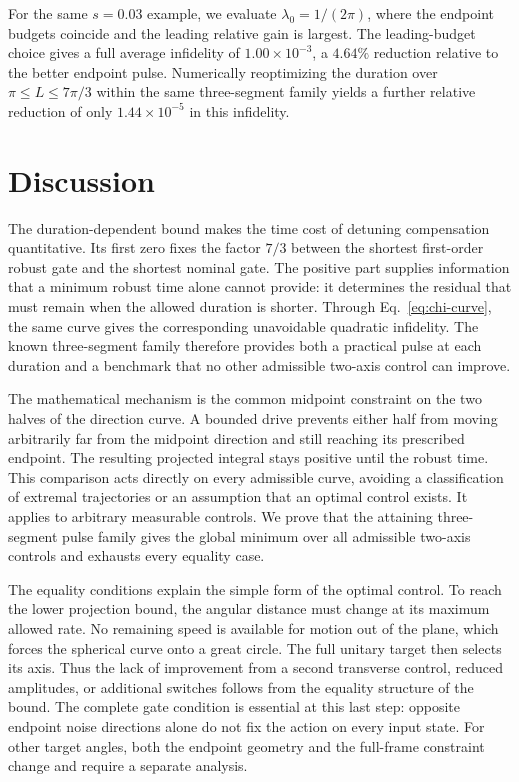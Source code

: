 \documentclass[12pt]{iopjournal}
\begin{document}
For the same $s=0.03$ example, we evaluate
$\lambda_0=1/(2\pi)$, where the endpoint budgets coincide and the
leading relative gain is largest. The leading-budget choice gives
a full average infidelity of $1.00\times10^{-3}$, a $4.64\%$
reduction relative to the better endpoint pulse.
Numerically reoptimizing the duration over $\pi\le L\le7\pi/3$
within the same three-segment family yields a further relative reduction
of only $1.44\times10^{-5}$ in this infidelity.

\section{Discussion}
\label{sec:discussion}

The duration-dependent bound makes the time cost of detuning
compensation quantitative. Its first zero fixes the factor $7/3$
between the shortest first-order robust gate and the shortest nominal
gate. The positive part supplies information that a minimum robust
time alone cannot provide: it determines the residual that must remain
when the allowed duration is shorter. Through
Eq.~\eqref{eq:chi-curve}, the same curve gives the corresponding
unavoidable quadratic infidelity. The known three-segment family
therefore provides both a practical pulse at each duration and a
benchmark that no other admissible two-axis control can improve.

The mathematical mechanism is the common midpoint constraint on the
two halves of the direction curve. A bounded drive prevents either
half from moving arbitrarily far from the midpoint direction and
still reaching its prescribed endpoint. The resulting projected
integral stays positive until the robust time. This comparison acts
directly on every admissible curve, avoiding a classification of
extremal trajectories or an assumption that an optimal control exists.
It applies to arbitrary measurable controls.
We prove that the attaining three-segment pulse family gives the
global minimum over all admissible two-axis controls and exhausts
every equality case.

The equality conditions explain the simple form of the optimal
control. To reach the lower projection bound, the angular distance
must change at its maximum allowed rate. No remaining speed is
available for motion out of the plane, which forces the spherical
curve onto a great circle. The full unitary target then selects its
axis. Thus the lack of improvement from a second transverse control,
reduced amplitudes, or additional switches follows from the equality
structure of the bound. The complete gate condition is essential at
this last step: opposite endpoint noise directions alone do not fix
the action on every input state. For other target angles, both the
endpoint geometry and the full-frame constraint change and require
a separate analysis.
\end{document}
